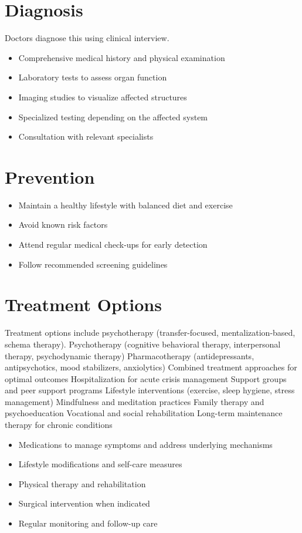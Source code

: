 \section{Diagnosis}
Doctors diagnose this using clinical interview.

\begin{itemize}[noitemsep]
  \item Comprehensive medical history and physical examination
  \item Laboratory tests to assess organ function
  \item Imaging studies to visualize affected structures
  \item Specialized testing depending on the affected system
  \item Consultation with relevant specialists
\end{itemize}
\section{Prevention}
\begin{itemize}[noitemsep]
  \item Maintain a healthy lifestyle with balanced diet and exercise
  \item Avoid known risk factors
  \item Attend regular medical check-ups for early detection
  \item Follow recommended screening guidelines
\end{itemize}
\section{Treatment Options}
Treatment options include psychotherapy (transfer-focused, mentalization-based, schema therapy). Psychotherapy (cognitive behavioral therapy, interpersonal therapy, psychodynamic therapy) Pharmacotherapy (antidepressants, antipsychotics, mood stabilizers, anxiolytics) Combined treatment approaches for optimal outcomes Hospitalization for acute crisis management Support groups and peer support programs Lifestyle interventions (exercise, sleep hygiene, stress management) Mindfulness and meditation practices Family therapy and psychoeducation Vocational and social rehabilitation Long-term maintenance therapy for chronic conditions

\begin{itemize}[noitemsep]
  \item Medications to manage symptoms and address underlying mechanisms
  \item Lifestyle modifications and self-care measures
  \item Physical therapy and rehabilitation
  \item Surgical intervention when indicated
  \item Regular monitoring and follow-up care
\end{itemize}
